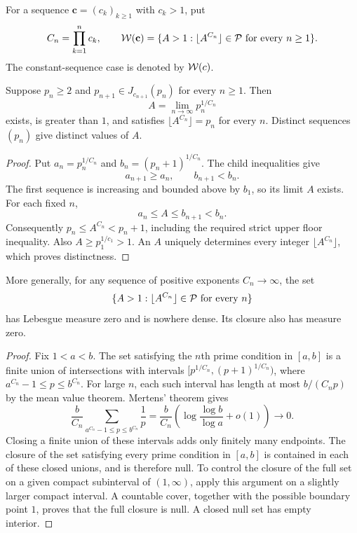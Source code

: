 For a sequence $\mathbf c=(c_k)_{k\ge1}$ with $c_k>1$, put
\[
 C_n=\prod_{k=1}^n c_k,\qquad
 \mathcal W(\mathbf c)=
 \{A>1:\lfloor A^{C_n}\rfloor\in\mathcal P\text{ for every }n\ge1\}.
\]
The constant-sequence case is denoted by $\mathcal W(c)$.

\begin{lemma}\label{hb:lem:nesting}
Suppose $p_n\ge2$ and
$p_{n+1}\in J_{c_{n+1}}(p_n)$ for every $n\ge1$.
Then
\[
 A=\lim_{n\to\infty}p_n^{1/C_n}
\]
exists, is greater than $1$, and satisfies
$\lfloor A^{C_n}\rfloor=p_n$ for every $n$.
Distinct sequences $(p_n)$ give distinct values of $A$.
\end{lemma}

\begin{proof}
Put $a_n=p_n^{1/C_n}$ and $b_n=(p_n+1)^{1/C_n}$.
The child inequalities give
\[
 a_{n+1}\ge a_n,\qquad b_{n+1}<b_n.
\]
The first sequence is increasing and bounded above by $b_1$,
so its limit $A$ exists.  For each fixed $n$,
\[
 a_n\le A\le b_{n+1}<b_n.
 \tag{E}\label{hb:eq:endpoints}
\]
Consequently $p_n\le A^{C_n}<p_n+1$, including the required
strict upper floor inequality.  Also $A\ge p_1^{1/c_1}>1$.
An $A$ uniquely determines every integer $\lfloor A^{C_n}\rfloor$,
which proves distinctness.
\end{proof}

\begin{proposition}
\label{hb:prop:null}
More generally, for any sequence of positive exponents $C_n\to\infty$,
the set
\[
 \{A>1:\lfloor A^{C_n}\rfloor\in\mathcal P\text{ for every }n\}
\]
has Lebesgue measure zero and is nowhere dense.  Its closure also
has measure zero.
\end{proposition}

\begin{proof}
Fix $1<a<b$.  The set satisfying the $n$th prime condition in
$[a,b]$ is a finite union of intersections with intervals
$[p^{1/C_n},(p+1)^{1/C_n})$, where
$a^{C_n}-1\le p\le b^{C_n}$.
For large $n$, each such interval has length at most
$b/(C_np)$ by the mean value theorem.  Mertens' theorem gives
\[
 \frac b{C_n}\sum_{a^{C_n}-1\le p\le b^{C_n}}\frac1p
 =\frac b{C_n}
   \left(\log\frac{\log b}{\log a}+o(1)\right)
 \longrightarrow0.
\]
Closing a finite union of these intervals adds only finitely many
endpoints.  The closure of the set satisfying every prime condition
in $[a,b]$ is contained in each of these closed unions, and is
therefore null.  To control the closure of the full set on a given
compact subinterval of $(1,\infty)$, apply this argument on a
slightly larger compact interval.  A countable cover, together
with the possible boundary point $1$, proves that the full closure
is null.  A closed null set has empty interior.
\end{proof}

